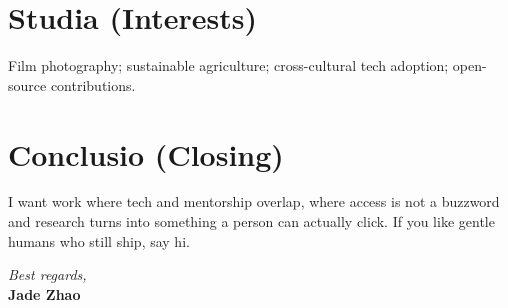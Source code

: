 \documentclass[11pt]{article}
\begin{document}
\section*{Studia (Interests)}
Film photography; sustainable agriculture; cross-cultural tech adoption; open-source contributions.

\section*{Conclusio (Closing)}
I want work where tech and mentorship overlap, where access is not a buzzword and research turns into something a person can actually click. If you like gentle humans who still ship, say hi.

\vspace{0.5em}
\textit{Best regards,}\\
\textbf{Jade Zhao}
\end{document}
